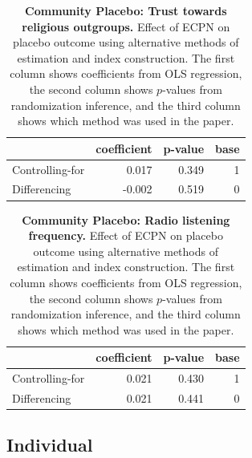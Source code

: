 \documentclass[
]{article}
\begin{document}
\begin{table}[H]
\begin{center}
\label{tab:pl_out_tab}
\caption{\textbf{Community Placebo: Trust towards religious outgroups.} Effect of ECPN on placebo outcome using alternative methods of estimation and index construction. The first column shows coefficients from OLS regression, the second column shows $p$-values from randomization inference, and the third column shows which method was used in the paper.}
\smallskip

\begin{tabular}{l|r|r|r}
\hline
  & coefficient & p-value & base\\
\hline
Controlling-for & 0.017 & 0.349 & 1\\
\hline
Differencing & -0.002 & 0.519 & 0\\
\hline
\end{tabular}


\end{center}
\end{table}

\begin{table}[H]
\begin{center}
\label{tab:pl_rad_tab}
\caption{\textbf{Community Placebo: Radio listening frequency.} Effect of ECPN on placebo outcome using alternative methods of estimation and index construction. The first column shows coefficients from OLS regression, the second column shows $p$-values from randomization inference, and the third column shows which method was used in the paper.}
\smallskip

\begin{tabular}{l|r|r|r}
\hline
  & coefficient & p-value & base\\
\hline
Controlling-for & 0.021 & 0.430 & 1\\
\hline
Differencing & 0.021 & 0.441 & 0\\
\hline
\end{tabular}


\end{center}
\end{table}

\hypertarget{individual}{%
\subsection{Individual}\label{individual}}
\end{document}
